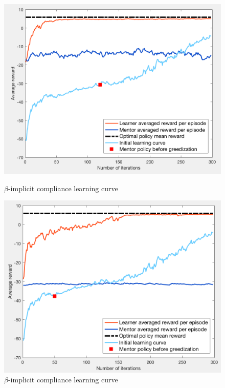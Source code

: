 \documentclass[a4paper]{report}
\begin{document}
{{{{				\begin{figure}[ht!]
					\begin{minipage}{0.5\linewidth}
						\begin{center}
							\includegraphics[width=0.95\linewidth]{ac_il_subopt_120}
							\caption{$\beta$-implicit compliance learning curve}
							\label{fig::ac_il_subopt_120}
						\end{center}
					\end{minipage}
					\begin{minipage}{0.5\linewidth}
						\begin{center}
							\includegraphics[width=0.95\linewidth]{ac_il_subopt_50}
							\caption{$\beta$-implicit compliance learning curve}
							\label{fig::ac_il_subopt_50}
						\end{center}
					\end{minipage}
				\end{figure}
				
}}}}
\end{document}
